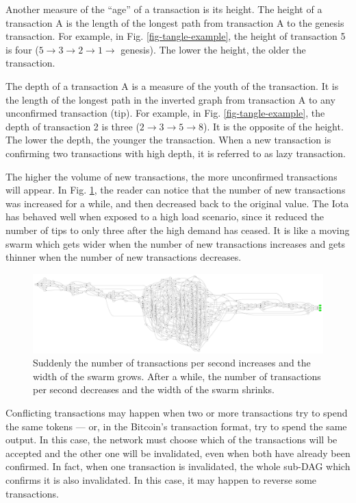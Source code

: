 Another measure of the ``age'' of a transaction is its height. The height of a transaction A is the length of the longest path from transaction A to the genesis transaction. For example, in Fig. \ref{fig-tangle-example}, the height of transaction 5 is four ($5 \rightarrow 3 \rightarrow 2 \rightarrow 1 \rightarrow$ genesis). The lower the height, the older the transaction.

The depth of a transaction A is a measure of the youth of the transaction. It is the length of the longest path in the inverted graph from transaction A to any unconfirmed transaction (tip). For example, in Fig. \ref{fig-tangle-example}, the depth of transaction 2 is three ($2 \rightarrow 3 \rightarrow 5 \rightarrow 8$). It is the opposite of the height. The lower the depth, the younger the transaction. When a new transaction is confirming two transactions with high depth, it is referred to as lazy transaction.

The higher the volume of new transactions, the more unconfirmed transactions will appear. In Fig. \ref{fig-tangle-swarm}, the reader can notice that the number of new transactions was increased for a while, and then decreased back to the original value. The Iota has behaved well when exposed to a high load scenario, since it reduced the number of tips to only three after the high demand has ceased. It is like a moving swarm which gets wider when the number of new transactions increases and gets thinner when the number of new transactions decreases.

\begin{figure}[ht]
\centering\includegraphics[width=\textwidth]{./images01/fig-tangle-swarm.pdf}
\caption{Suddenly the number of transactions per second increases and the width of the swarm grows. After a while, the number of transactions per second decreases and the width of the swarm shrinks.\label{fig-tangle-swarm}}
\end{figure}

Conflicting transactions may happen when two or more transactions try to spend the same tokens --- or, in the Bitcoin's transaction format, try to spend the same output. In this case, the network must choose which of the transactions will be accepted and the other one will be invalidated, even when both have already been confirmed. In fact, when one transaction is invalidated, the whole sub-DAG which confirms it is also invalidated. In this case, it may happen to reverse some transactions.

